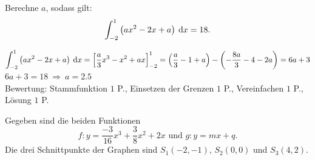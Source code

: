 \documentclass[11pt]{exam}
\begin{document}
\begin{questions}
\question[4] %
Berechne $a$, sodass gilt: \[\int_{-2}^1\left(ax^2-2x+a\right)\:\operatorname{d}\!{x}=18.\]
{\begin{solution}
		$\displaystyle\int_{-2}^1\left(ax^2-2x+a\right)\:\operatorname{d}\!{x}=\left[\frac{a}{3}x^3-x^2+ax\right]_{-2}^1=\left(\frac{a}{3}-1+a\right)-\left(-\frac{8a}{3}-4-2a\right)=6a+3$\\
		$6a+3=18\ \Rightarrow\ a=2.5$\\
		Bewertung: Stammfunktion $1$ P., Einsetzen der Grenzen $1$ P., Vereinfachen $1$ P., Lösung $1$ P.
\end{solution}}
{}


\noaddpoints
\question[\totalpoints] %
\addpoints
\begin{minipage}{0.6\linewidth}
    Gegeben sind die beiden Funktionen \[f:y=\frac{-3}{16}x^3+\frac{3}{8}x^2+2x \text{ und } g:y=mx+q.\] Die drei Schnittpunkte der Graphen sind ${S_1(-2,-1)}$, $S_2(0,0)$ und $S_3(4,2)$.\vspace{5pt}
\end{minipage}
\end{questions}
\end{document}
